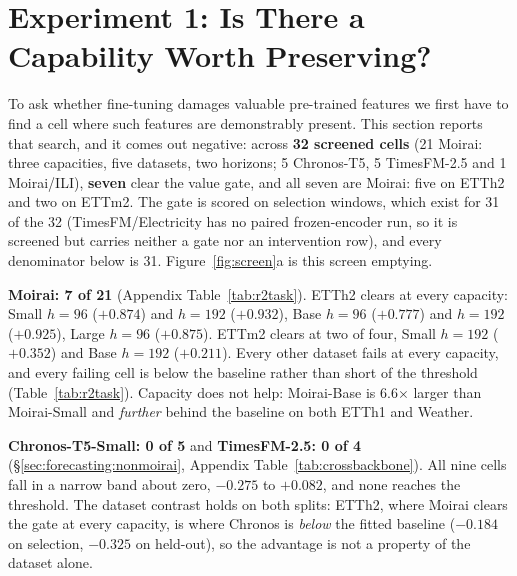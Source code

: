 \section{Experiment 1: Is There a Capability Worth Preserving?}
\label{sec:forecasting}
\label{sec:forecasting:gate}

To ask whether fine-tuning damages valuable pre-trained features we first have
to find a cell where such features are demonstrably present.  This section
reports that search, and it comes out negative: across \textbf{32 screened
cells} (21 Moirai: three capacities, five datasets, two horizons; 5
Chronos-T5, 5 TimesFM-2.5 and 1 Moirai/ILI), \textbf{seven} clear the value gate,
and all seven are Moirai: five on ETTh2 and two on ETTm2.  The gate is scored on
selection windows, which exist for 31 of the 32 (TimesFM/Electricity has no
paired frozen-encoder run, so it is screened but carries neither a gate nor an
intervention row), and every denominator below is 31.
Figure~\ref{fig:screen}a is this screen emptying.

\textbf{Moirai: 7 of 21} (Appendix Table~\ref{tab:r2task}).  ETTh2 clears at
every capacity: Small $h{=}96$ ($+0.874$) and $h{=}192$ ($+0.932$), Base
$h{=}96$ ($+0.777$) and $h{=}192$ ($+0.925$), Large $h{=}96$ ($+0.875$).
ETTm2 clears at two of four, Small $h{=}192$ ($+0.352$) and Base $h{=}192$
($+0.211$).  Every other dataset fails at every capacity, and every failing cell
is below the baseline rather than short of the threshold (Table~\ref{tab:r2task}).
Capacity does not help: Moirai-Base is 6.6$\times$ larger than
Moirai-Small and \emph{further} behind the baseline on both ETTh1 and Weather.

\textbf{Chronos-T5-Small: 0 of 5} and \textbf{TimesFM-2.5: 0 of 4}
(\S\ref{sec:forecasting:nonmoirai}, Appendix Table~\ref{tab:crossbackbone}).
All nine cells fall in a narrow band about zero, $-0.275$ to $+0.082$, and none
reaches the threshold.
The dataset contrast holds on both splits: ETTh2, where Moirai clears the gate at every capacity, is where
Chronos is \emph{below} the fitted baseline ($-0.184$ on selection, $-0.325$ on
held-out), so the advantage is not a property of the dataset alone.

